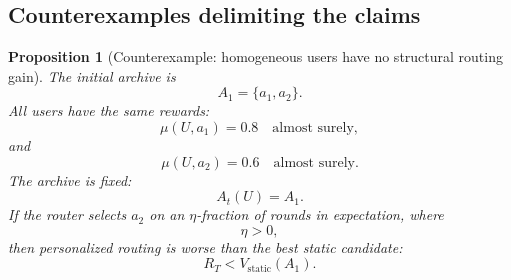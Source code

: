 \documentclass{article} %
\newtheorem{proposition}[theorem]{Proposition}
\begin{document}
\subsection{Counterexamples delimiting the claims}

\begin{proposition}[Counterexample: homogeneous users have no structural routing gain]
\label{prop:8}
The initial archive is
\begin{equation}
\label{eq:app-fourth-hom-a}
A_1
=
\{a_1,a_2\}.
\end{equation}
All users have the same rewards:
\begin{equation}
\label{eq:app-fourth-hom-mu1}
\mu(U,a_1)=0.8
\quad
\text{almost surely},
\end{equation}
and
\begin{equation}
\label{eq:app-fourth-hom-mu2}
\mu(U,a_2)=0.6
\quad
\text{almost surely}.
\end{equation}
The archive is fixed:
\begin{equation}
\label{eq:app-fourth-hom-fixed}
A_t(U)=A_1.
\end{equation}
If the router selects \(a_2\) on an \(\eta\)-fraction of rounds in expectation, where
\begin{equation}
\label{eq:app-fourth-hom-eta}
\eta>0,
\end{equation}
then personalized routing is worse than the best static candidate:
\begin{equation}
\label{eq:app-fourth-hom-loss}
R_T
<
V_{\mathrm{static}}(A_1).
\end{equation}
\end{proposition}
\end{document}
